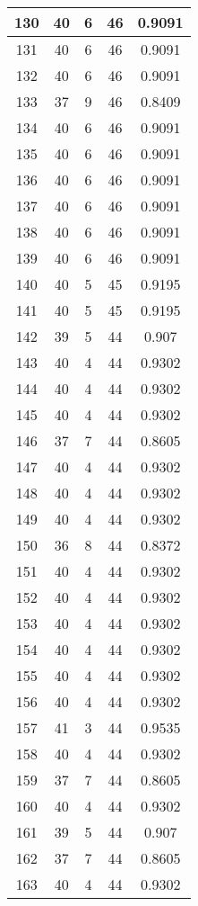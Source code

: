 \documentclass[letterpaper, 12pt]{article}
\begin{document}
\begin{longtable}{|c|c|c|c|c|}
\hline
130 & 40 & 6 & 46 & 0.9091 \\
\hline
131 & 40 & 6 & 46 & 0.9091 \\
\hline
132 & 40 & 6 & 46 & 0.9091 \\
\hline
133 & 37 & 9 & 46 & 0.8409 \\
\hline
134 & 40 & 6 & 46 & 0.9091 \\
\hline
135 & 40 & 6 & 46 & 0.9091 \\
\hline
136 & 40 & 6 & 46 & 0.9091 \\
\hline
137 & 40 & 6 & 46 & 0.9091 \\
\hline
138 & 40 & 6 & 46 & 0.9091 \\
\hline
139 & 40 & 6 & 46 & 0.9091 \\
\hline
140 & 40 & 5 & 45 & 0.9195 \\
\hline
141 & 40 & 5 & 45 & 0.9195 \\
\hline
142 & 39 & 5 & 44 & 0.907 \\
\hline
143 & 40 & 4 & 44 & 0.9302 \\
\hline
144 & 40 & 4 & 44 & 0.9302 \\
\hline
145 & 40 & 4 & 44 & 0.9302 \\
\hline
146 & 37 & 7 & 44 & 0.8605 \\
\hline
147 & 40 & 4 & 44 & 0.9302 \\
\hline
148 & 40 & 4 & 44 & 0.9302 \\
\hline
149 & 40 & 4 & 44 & 0.9302 \\
\hline
150 & 36 & 8 & 44 & 0.8372 \\
\hline
151 & 40 & 4 & 44 & 0.9302 \\
\hline
152 & 40 & 4 & 44 & 0.9302 \\
\hline
153 & 40 & 4 & 44 & 0.9302 \\
\hline
154 & 40 & 4 & 44 & 0.9302 \\
\hline
155 & 40 & 4 & 44 & 0.9302 \\
\hline
156 & 40 & 4 & 44 & 0.9302 \\
\hline
157 & 41 & 3 & 44 & 0.9535 \\
\hline
158 & 40 & 4 & 44 & 0.9302 \\
\hline
159 & 37 & 7 & 44 & 0.8605 \\
\hline
160 & 40 & 4 & 44 & 0.9302 \\
\hline
161 & 39 & 5 & 44 & 0.907 \\
\hline
162 & 37 & 7 & 44 & 0.8605 \\
\hline
163 & 40 & 4 & 44 & 0.9302 \\

\end{longtable}
\end{document}
